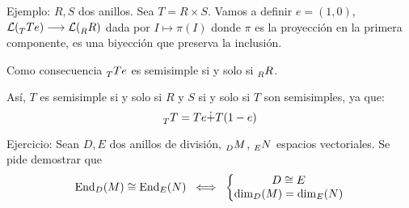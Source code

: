 Ejemplo: \(R, S\) dos anillos. Sea \(T=R\times S\). Vamos a definir
\(e=(1,0)\), \(\mathcal{L}(\prescript{}{T}{Te})\longrightarrow
\mathcal{L}(\prescript{}{R}{R})\) dada por \(I\mapsto\pi(I)\) donde
\(\pi\) es la proyección en la primera componente, es una biyección que
preserva la inclusión.

Como consecuencia \(\prescript{}{T}{Te}\) es semisimple si y solo si
\(\prescript{}{R}{R}\).

Así, \(T\) es semisimple si y solo si \(R\) y \(S\) si y solo si \(T\)
son semisimples, ya que:
\[
  \prescript{}{T}{T}=Te\dot{+}T(1-e)
\]

Ejercicio: Sean \(D, E\) dos anillos de división, \(\prescript{}{D}{M}\),
\(\prescript{}{E}{N}\) espacios vectoriales. Se pide demostrar que
\[
  \operatorname{End}_D(M)\cong\operatorname{End}_E(N)\;\iff\;
  \left\{
  \begin{matrix}
    D\cong E\\
    \dim_D(M)=\dim_E(N)
  \end{matrix}
  \right.
\]
